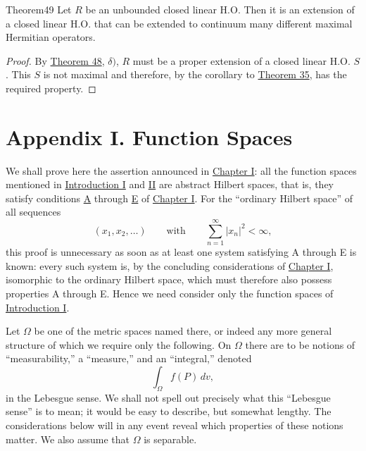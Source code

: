 ﻿\documentclass[paper=b5,fontsize=13pt,bookmarkpackage=false,twoside]{scrartcl}
\begin{document}
\begin{namedstatement}{Theorem}{49}\label{thm:49}
Let $R$ be an unbounded closed linear H.O. Then it is an extension of a closed linear H.O. that can be extended to continuum many different maximal Hermitian operators.
\end{namedstatement}

\begin{proof}
By \hyperref[thm:48]{Theorem 48}, $\delta)$, $R$ must be a proper extension of a closed linear H.O. $S$. This $S$ is not maximal and therefore, by the corollary to \hyperref[thm:35]{Theorem 35}, has the required property.
\end{proof}

\section*{Appendix I. Function Spaces}\label{app:I}

We shall prove here the assertion announced in \hyperref[chap:I]{Chapter I}: all the function spaces mentioned in \hyperref[intro:I]{Introduction I} and \hyperref[intro:II]{II} are abstract Hilbert spaces, that is, they satisfy conditions \hyperref[axiom:A]{A} through \hyperref[axiom:E]{E} of \hyperref[chap:I]{Chapter I}. For the ``ordinary Hilbert space'' of all sequences
\[
(x_1,x_2,\ldots)
\qquad\text{with}\qquad
\sum_{n=1}^{\infty}|x_n|^2<\infty,
\]
this proof is unnecessary as soon as at least one system satisfying A through E is known: every such system is, by the concluding considerations of \hyperref[chap:I]{Chapter I}, isomorphic to the ordinary Hilbert space, which must therefore also possess properties A through E. Hence we need consider only the function spaces of \hyperref[intro:I]{Introduction I}.

Let $\Omega$ be one of the metric spaces named there, or indeed any more general structure of which we require only the following. On $\Omega$ there are to be notions of ``measurability,'' a ``measure,'' and an ``integral,'' denoted
\[
\int_\Omega f(P)\,dv,
\]
in the Lebesgue sense. We shall not spell out precisely what this ``Lebesgue sense'' is to mean; it would be easy to describe, but somewhat lengthy. The considerations below will in any event reveal which properties of these notions matter. We also assume that $\Omega$ is separable.
\end{document}
